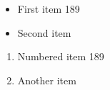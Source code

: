 \documentclass{article}
\begin{document}
\begin{itemize}
\item First item 189
\item Second item
\end{itemize}
\begin{enumerate}
\item Numbered item 189
\item Another item
\end{enumerate}
\end{document}
